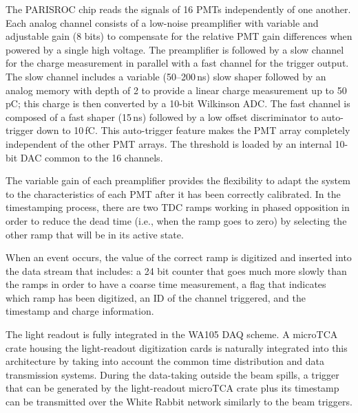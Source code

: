 The PARISROC chip reads the signals of 16 PMTs
independently of one another. Each analog channel consists of a
low-noise preamplifier with variable and adjustable gain (8 bits) to
compensate for the relative PMT gain differences when
powered by a single high voltage. The preamplifier is followed by a
slow channel for the charge measurement in parallel with a fast
channel for the trigger output. The slow channel includes a variable
(50--200\,ns) slow shaper followed by an analog memory with depth of 2
to provide a linear charge measurement up to 50\,pC; this charge is
then converted by a 10-bit Wilkinson ADC. The fast channel is composed
of a fast shaper (15\,ns) followed by a low offset discriminator to
auto-trigger down to 10\,fC. This auto-trigger feature makes the PMT
array completely independent of the other PMT arrays. The
threshold is loaded by an internal 10-bit DAC common to the 16
channels.


The variable gain of each preamplifier provides the flexibility to
adapt the system to the characteristics of each PMT after
it has been correctly calibrated. In the timestamping process, there
are two TDC ramps working in phased opposition in order to reduce the
dead time (i.e., when the ramp goes to zero) by selecting the other ramp
that will be in its active state.

When an event occurs, the value of the correct ramp is digitized and
inserted into the data stream that includes: a 24 bit counter that
goes much more slowly than the ramps in order to have a coarse time
measurement, a flag that indicates which ramp has been digitized, an
ID of the channel triggered, and the timestamp and charge information.


The light readout is fully integrated in the WA105 DAQ scheme. A
microTCA crate housing the light-readout digitization cards is
naturally integrated into this architecture by taking into account the
common time distribution and data transmission systems.  During the
data-taking outside the beam spills, a trigger that can be generated
by the light-readout microTCA crate plus its timestamp can be
transmitted over the White Rabbit network similarly to the beam
triggers.

